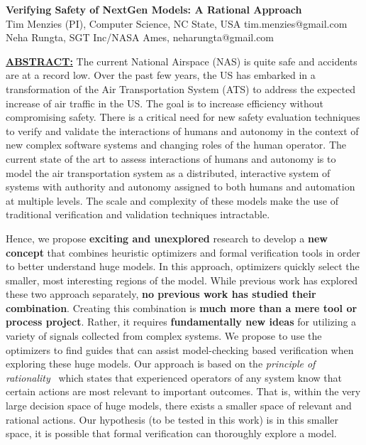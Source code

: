 \documentclass[12pt]{article}
\begin{document}
 
\begin{center}
{\Large {\bf  Verifying Safety of NextGen Models: A Rational Approach}}\\
Tim Menzies (PI), Computer Science, NC State, USA tim.menzies@gmail.com\\ 
Neha Rungta,  SGT Inc/NASA Ames,  neharungta@gmail.com
\end{center}

\underline{{\bf ABSTRACT:}}  
The current National Airspace (NAS) is quite safe and accidents are at a record low. Over the past few years, the US has embarked in a transformation of the Air Transportation System (ATS) to address the expected increase of air traffic in the US. The goal is to increase efficiency without compromising safety. There is a critical need for new safety evaluation techniques to verify and validate the interactions of humans and autonomy in the context of new complex software systems and changing roles of the human operator. 
The current state of the art to assess interactions of humans and autonomy is to model the air transportation system as a distributed, interactive system of systems with authority and autonomy assigned to both humans and automation at multiple levels. The scale and complexity of these models make the use of traditional verification and validation techniques intractable. 

Hence, we  propose   {\bf exciting and unexplored} research to develop a {\bf new concept} that combines
heuristic optimizers
and formal verification tools in order to better understand huge models. 
 In this approach,  optimizers quickly select the smaller, most interesting regions of the model.
 While previous work has explored these two approach separately, 
{\bf no 
previous work has studied their combination}. Creating this combination is {\bf much more than a mere tool
or process project}. Rather, it requires  {\bf fundamentally new ideas} for  utilizing a variety of signals
collected from complex systems.  
We propose to use the optimizers to find  guides
that can assist model-checking based verification when exploring these huge models. Our approach is based on the  {\em principle of rationality}~\cite{Newell88} which states that experienced operators of any system know that certain actions are most relevant to important outcomes. That is, within the very large decision space of huge models, there exists a  smaller space of relevant and rational actions. 
Our hypothesis (to be tested in this work) is in this smaller space, it is possible that formal verification can thoroughly explore a model.
\end{document}
